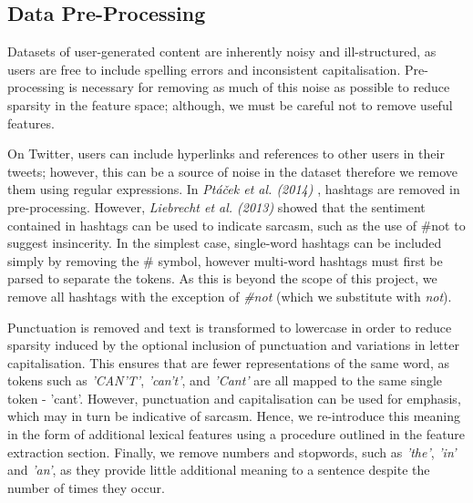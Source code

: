 \documentclass[12pt,a4paper]{article}
\begin{document}
\subsection{Data Pre-Processing}
\vspace{-4.2pt}
\noindent Datasets of user-generated content are inherently noisy and ill-structured, as users are free to include spelling errors and inconsistent capitalisation. Pre-processing is necessary for removing as much of this noise as possible to reduce sparsity in the feature space; although, we must be careful not to remove useful features.

On Twitter, users can include hyperlinks and references to other users in their tweets; however, this can be a source of noise in the dataset therefore we remove them using regular expressions. In \textit{Pt{\'a}{\v{c}ek et al. (2014)}} \cite{ptavcek2014sarcasm}, hashtags are removed in pre-processing. However, \textit{Liebrecht et al. (2013)} \cite{liebrecht2013perfect} showed that the sentiment contained in hashtags can be used to indicate sarcasm, such as the use of \#not to suggest insincerity. In the simplest case, single-word hashtags can be included simply by removing the \# symbol, however multi-word hashtags must first be parsed to separate the tokens. As this is beyond the scope of this project, we remove all hashtags with the exception of \textit{\#not} (which we substitute with \textit{not}).

Punctuation is removed and text is transformed to lowercase in order to reduce sparsity induced by the optional inclusion of punctuation and variations in letter capitalisation. This ensures that are fewer representations of the same word, as tokens such as \textit{'CAN'T'}, \textit{'can't'}, and \textit{'Cant'} are all mapped to the same single token - 'cant'. However, punctuation and capitalisation can be used for emphasis, which may in turn be indicative of sarcasm. Hence, we re-introduce this meaning in the form of additional lexical features using a procedure outlined in the feature extraction section. Finally, we remove numbers and stopwords, such as \textit{'the'}, \textit{'in'} and \textit{'an'}, as they provide little additional meaning to a sentence despite the number of times they occur.
\end{document}
